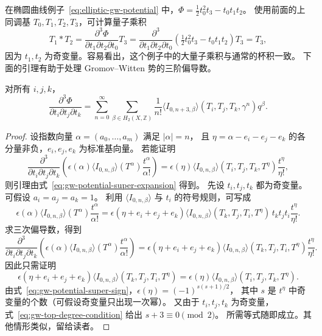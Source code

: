 在椭圆曲线例子~\eqref{eq:elliptic-gw-potential} 中，$\Phi=\tfrac12t_0^2t_3-t_0t_1t_2$。
使用前面的上同调基 $T_0,T_1,T_2,T_3$，可计算量子乘积
\[
T_1*T_2=\frac{\partial^3\Phi}{\partial t_1\partial t_2\partial t_0}T_3
=\frac{\partial^3}{\partial t_1\partial t_2\partial t_0}
\left(\tfrac12t_0^2t_3-t_0t_1t_2\right)T_3=T_3,
\]
因为 $t_1,t_2$ 为奇变量。容易看出，这个例子中的大量子乘积与通常的杯积一致。
下面的引理有助于处理 Gromov--Witten 势的三阶偏导数。
\begin{lemma}\label{lem:gw-potential-third-derivatives}
对所有 $i,j,k$，
\[
\frac{\partial^3\Phi}{\partial t_i\partial t_j\partial t_k}
=\sum_{n=0}^{\infty}\sum_{\beta\in H_2(X,\mathbb Z)}
\frac1{n!}\langle I_{0,n+3,\beta}\rangle(T_i,T_j,T_k,\gamma^n)q^\beta.
\]
\end{lemma}
\begin{proof}
设指数向量 $\alpha=(a_0,\ldots,a_m)$ 满足 $|\alpha|=n$，
且 $\eta=\alpha-e_i-e_j-e_k$ 的各分量非负，$e_i,e_j,e_k$ 为标准基向量。
若能证明
\[
\frac{\partial^3}{\partial t_i\partial t_j\partial t_k}
\left(\epsilon(\alpha)\langle I_{0,n,\beta}\rangle(T^\alpha)\frac{t^\alpha}{\alpha!}\right)
=\epsilon(\eta)\langle I_{0,n,\beta}\rangle(T_i,T_j,T_k,T^\eta)\frac{t^\eta}{\eta!},
\]
则引理由式~\eqref{eq:gw-potential-super-expansion} 得到。
先设 $t_i,t_j,t_k$ 都为奇变量。可假设 $a_i=a_j=a_k=1$。
利用 $\langle I_{0,n,\beta}\rangle$ 与 $t_i$ 的符号规则，可写成
\[
\epsilon(\alpha)\langle I_{0,n,\beta}\rangle(T^\alpha)\frac{t^\alpha}{\alpha!}
=\epsilon(\eta+e_i+e_j+e_k)\langle I_{0,n,\beta}\rangle(T_k,T_j,T_i,T^\eta)
\,t_kt_jt_i\frac{t^\eta}{\eta!}.
\]
求三次偏导数，得到
\[
\frac{\partial^3}{\partial t_i\partial t_j\partial t_k}
\left(\epsilon(\alpha)\langle I_{0,n,\beta}\rangle(T^\alpha)\frac{t^\alpha}{\alpha!}\right)
=\epsilon(\eta+e_i+e_j+e_k)\langle I_{0,n,\beta}\rangle(T_k,T_j,T_i,T^\eta)\frac{t^\eta}{\eta!}.
\]
因此只需证明
\[
\epsilon(\eta+e_i+e_j+e_k)\langle I_{0,n,\beta}\rangle(T_k,T_j,T_i,T^\eta)
=\epsilon(\eta)\langle I_{0,n,\beta}\rangle(T_i,T_j,T_k,T^\eta).
\]
由式~\eqref{eq:gw-potential-super-sign}，$\epsilon(\eta)=(-1)^{s(s+1)/2}$，
其中 $s$ 是 $t^\eta$ 中奇变量的个数（可假设奇变量只出现一次幂）。
又由于 $t_i,t_j,t_k$ 为奇变量，式~\eqref{eq:gw-top-degree-condition} 给出 $s+3\equiv0\pmod2$。
所需等式随即成立。其他情形类似，留给读者。
\end{proof}

